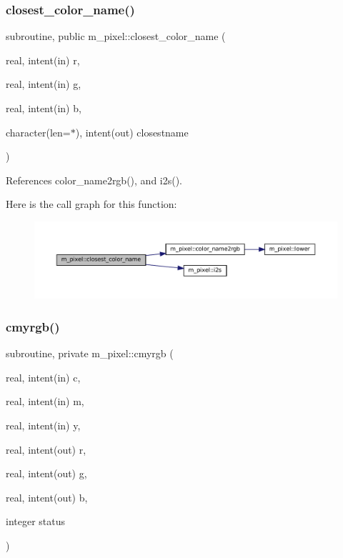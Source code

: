 \subsubsection{\texorpdfstring{closest\+\_\+color\+\_\+name()}{closest\_color\_name()}}
{\footnotesize\ttfamily subroutine, public m\+\_\+pixel\+::closest\+\_\+color\+\_\+name (\begin{DoxyParamCaption}\item[{real, intent(in)}]{r,  }\item[{real, intent(in)}]{g,  }\item[{real, intent(in)}]{b,  }\item[{character(len=$\ast$), intent(out)}]{closestname }\end{DoxyParamCaption})}



References color\+\_\+name2rgb(), and i2s().

Here is the call graph for this function\+:
\nopagebreak
\begin{figure}[H]
\begin{center}
\leavevmode
\includegraphics[width=350pt]{namespacem__pixel_a8555eecec7e18106e8167e137cfe8424_cgraph}
\end{center}
\end{figure}
\mbox{\label{namespacem__pixel_a98c49513d301803bb2c5cd28b8ccdba3}} 
\subsubsection{\texorpdfstring{cmyrgb()}{cmyrgb()}}
{\footnotesize\ttfamily subroutine, private m\+\_\+pixel\+::cmyrgb (\begin{DoxyParamCaption}\item[{real, intent(in)}]{c,  }\item[{real, intent(in)}]{m,  }\item[{real, intent(in)}]{y,  }\item[{real, intent(out)}]{r,  }\item[{real, intent(out)}]{g,  }\item[{real, intent(out)}]{b,  }\item[{integer}]{status }\end{DoxyParamCaption})\hspace{0.3cm}{\ttfamily [private]}}

